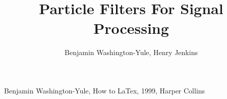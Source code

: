 \documentclass[a4paper, 12pt]{article}
\begin{document}
\title{Particle Filters For Signal Processing}
\author{Benjamin Washington-Yule, Henry Jenkins}

\maketitle
% 








\begin{thebibliography}{99}
 Benjamin Washington-Yule, How to LaTex, 1999, Harper Collins
\end{thebibliography}
\end{document}
